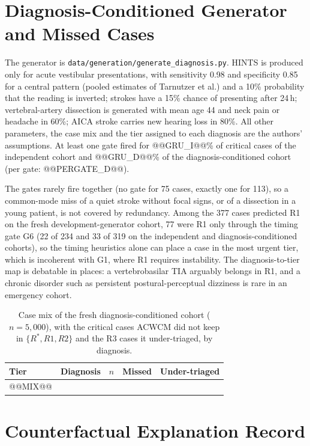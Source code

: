 \documentclass[11pt,a4paper]{article}%
\begin{document}
\section{Diagnosis-Conditioned Generator and Missed Cases}\label{sup:diag}

The generator is \texttt{data/generation/generate\_diagnosis.py}. HINTS is produced only for acute vestibular presentations, with sensitivity 0.98 and specificity 0.85 for a central pattern (pooled estimates of Tarnutzer et al.) and a 10\% probability that the reading is inverted; strokes have a 15\% chance of presenting after 24\,h; vertebral-artery dissection is generated with mean age 44 and neck pain or headache in 60\%; AICA stroke carries new hearing loss in 80\%. All other parameters, the case mix and the tier assigned to each diagnosis are the authors' assumptions. At least one gate fired for @@GRU_I@@\% of critical cases of the independent cohort and @@GRU_D@@\% of the diagnosis-conditioned cohort (per gate: @@PERGATE_D@@).

The gates rarely fire together (no gate for 75 cases, exactly one for 113), so a common-mode miss of a quiet stroke without focal signs, or of a dissection in a young patient, is not covered by redundancy. Among the 377 cases predicted R1 on the fresh development-generator cohort, 77 were R1 only through the timing gate G6 (22 of 234 and 33 of 319 on the independent and diagnosis-conditioned cohorts), so the timing heuristics alone can place a case in the most urgent tier, which is incoherent with G1, where R1 requires instability. The diagnosis-to-tier map is debatable in places: a vertebrobasilar TIA arguably belongs in R1, and a chronic disorder such as persistent postural-perceptual dizziness is rare in an emergency cohort.

\begin{table}[h]
\caption{Case mix of the fresh diagnosis-conditioned cohort ($n=5{,}000$), with the critical cases ACWCM did not keep in $\{R^*,R1,R2\}$ and the R3 cases it under-triaged, by diagnosis.}\label{tab:mix}
\small
\begin{tabular}{@{}llrrr@{}}
\toprule
Tier & Diagnosis & $n$ & Missed & Under-triaged \\
\midrule
@@MIX@@
\bottomrule
\end{tabular}
\end{table}

\section{Counterfactual Explanation Record}\label{sup:cf}
\end{document}
